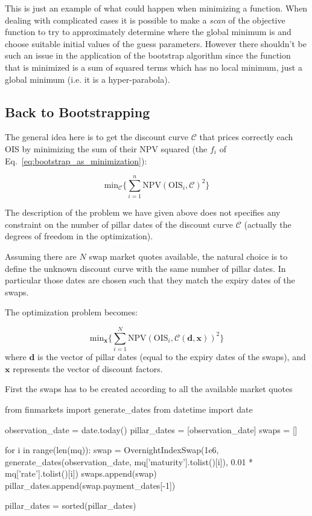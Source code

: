 This is just an example of what could happen when minimizing a function. When dealing with complicated cases it is possible to make a \emph{scan} of the objective function to try to approximately determine where the global minimum is and choose suitable initial values of the guess parameters.
However there shouldn't be such an issue in the application of the bootstrap algorithm since the function that is minimized is a sum of squared terms which has no local minimum, just a global minimum (i.e. it is a hyper-parabola).

\subsection{Back to Bootstrapping}
\label{ois-example}
The general idea here is to get the discount curve \(\mathcal{C}\) that prices correctly each OIS by minimizing the sum of their NPV squared (the \(f_i\) of Eq.~\ref{eq:bootstrap_as_minimization}):

\begin{equation}
\mathrm{min}_{\mathcal{C}} \Big\{\sum_{i=1}^{n}\mathrm{NPV}(\mathrm{OIS}_i, \mathcal{C})^2\Big\}
\end{equation}

The description of the problem we have given above does not specifies any constraint on the number of pillar dates of the discount curve \(\mathcal{C}\) (actually the degrees of freedom in the optimization).

Assuming there are $N$ swap market quotes available, the natural choice is to define the unknown discount curve with the same number of pillar dates. In particular those dates are chosen such that they match the expiry dates of the swaps.

The optimization problem becomes: 

\begin{equation}
\mathrm{min}_{\mathbf{x}} \Big\{\sum_{i=1}^{N}\mathrm{NPV}(\mathrm{OIS}_i, \mathcal{C}(\mathbf{d}, \mathbf{x}))^2\Big\}
\end{equation}
where \(\mathbf{d}\) is the vector of pillar dates (equal to the expiry dates of the swaps), and \(\mathbf{x}\) represents the vector of discount factors.

First the swaps has to be created according to all the available market quotes

\begin{ipython}
from finmarkets import generate_dates
from datetime import date

observation_date = date.today()
pillar_dates = [observation_date]
swaps = []

for i in range(len(mq)):
    swap = OvernightIndexSwap(1e6,
             generate_dates(observation_date,
                            mq['maturity'].tolist()[i]),
             0.01 * mq['rate'].tolist()[i])
    swaps.append(swap)
	pillar_dates.append(swap.payment_dates[-1])
	
pillar_dates = sorted(pillar_dates)
\end{ipython}

